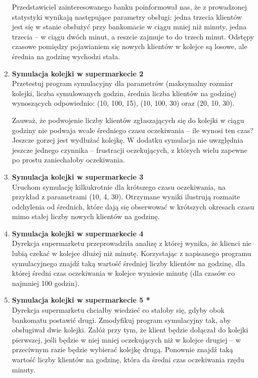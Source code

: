 \documentclass[12pt]{article}
\begin{document}
\begin{enumerate}
Przedstawiciel zainteresowanego banku poinformował
nas, że z prowadzonej statystyki wynikają następujące parametry obsługi: jedna trzecia klientów
jest się w stanie obsłużyć przy bankomacie w ciągu mniej niż minuty, jedna trzecia -- w ciągu
dwóch minut, a reszcie zajmuje to do trzech minut. Odstępy czasowe pomiędzy pojawianiem się
nowych klientów w kolejce są losowe, ale średnia na godzinę wychodzi stała.

\newpage

\item \textbf{Symulacja kolejki w supermarkecie 2}\\
Przetestuj program symulacyjny dla parametrów \textsf{(maksymalny rozmiar kolejki, liczba symulowanych godzin, średnia liczba klientów na godzinę)} wynoszących odpowiednio: \textsf{(10, 100, 15)}, \textsf{(10, 100, 30)} oraz \textsf{(20, 10, 30)}.

\vspace{0.1cm}
Zauważ, że podwojenie liczby klientów zgłaszających się do kolejki w ciągu godziny nie podwaja wcale średniego czasu oczekiwania -- ile wynosi ten czas? Jeszcze gorzej jest wydłużać kolejkę. W dodatku symulacja nie uwzględnia jeszcze jednego czynnika -- frustracji oczekujących, z których wielu zapewne po prostu zaniechałoby oczekiwania.

\item \textbf{Symulacja kolejki w supermarkecie 3}\\
Uruchom symulację kilkukrotnie dla krótszego czasu oczekiwania, na przykład z parametrami \textsf{(10, 4, 30)}. Otrzymane wyniki ilustrują rozmaite odchylenia od średnich, które dają się obserwować w krótszych okresach czasu mimo stałej liczby nowych klientów na godzinę. 

\item \textbf{Symulacja kolejki w supermarkecie 4}\\
Dyrekcja supermarketu przeprowadziła analizę z której wynika, że klienci nie lubią czekać
w kolejce dłużej niż minutę. Korzystając z napisanego programu symulacyjnego znajdź
taką wartość średniej liczby klientów na godzinę, dla której średni czas oczekiwania w kolejce
wyniesie minutę (dla czasów co najmniej 100 godzin).

\item \textbf{Symulacja kolejki w supermarkecie 5 *}\\
Dyrekcja supermarketu chciałby wiedzieć co stałoby się, gdyby obok bankomatu postawić drugi.
Zmodyfikuj program symulacyjny tak, aby obsługiwał dwie kolejki. Załóż
przy tym, że klient będzie dołączał do kolejki pierwszej, jeśli będzie w niej mniej oczekujących
niż w kolejce drugiej -- w przeciwnym razie będzie wybierać kolejkę drugą. Ponownie
znajdź taką wartość liczby klientów na godzinę, która da średni czas oczekiwania rzędu
minuty.


\end{enumerate}
\end{document}
